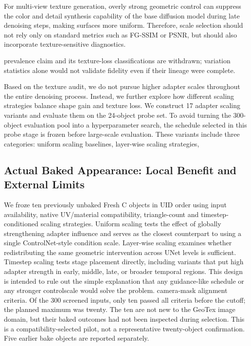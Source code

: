 \documentclass[times,twocolumn,final]{elsarticle}
\providecommand{\DIFadd}[1]{{\protect\color{blue} \sf #1}} %
\providecommand{\DIFdel}[1]{{\protect\color{red} \scriptsize #1}} %
\providecommand{\DIFaddbegin}{} %
\providecommand{\DIFaddend}{} %
\providecommand{\DIFdelbegin}{} %
\providecommand{\DIFdelend}{} %
\begin{document}
\DIFdel{For multi-view texture generation, overly strong geometric control can suppress the color and detail synthesis capability of the base diffusion model during late denoising steps, making surfaces more uniform. Therefore, scale selection should not rely only on standard metrics such as FG-SSIM or PSNR, but should also incorporate texture-sensitive diagnostics. }%

\DIFdelend \DIFaddbegin \DIFadd{prevalence claim and its texture-loss classifications are withdrawn; variation statistics alone would not validate fidelity even if their lineage were complete.
}\DIFaddend 


\DIFdelbegin \DIFdel{Based on the texture audit, we do not pursue higher adapter scales throughout the entire denoising process. Instead, we further explore how different scaling strategies balance shape gain and texture loss. We construct 17 adapter scaling variants and evaluate them on the 24-object probe set. To avoid turning the 300-object evaluation pool into a hyperparameter search, the schedule selected in this probe stage is frozen before large-scale evaluation. These variants include three categories: uniform scaling baselines, layer-wise scaling strategies, }\DIFdelend \DIFaddbegin \subsection{Actual Baked Appearance: Local Benefit and External Limits}
\label{subsec:new-bake}
\DIFadd{We froze ten previously unbaked Fresh C objects in UID order using input availability, native UV/material compatibility, triangle-count }\DIFaddend and \DIFdelbegin \DIFdel{timestep-conditioned scaling strategies.
Uniform scaling tests the effect of globally strengthening adapter influence and serves as the closest counterpart to using a single ControlNet-style condition scale. Layer-wise scaling examines whether redistributing the same geometric intervention across UNet levels is sufficient. Timestep scaling tests stage placement directly, including variants that put high adapter strength in early, middle, late, or broader temporal regions. This design is intended to rule out the simple explanation that any guidance-like schedule or any stronger controlscale would solve the problem. }\DIFdelend \DIFaddbegin \DIFadd{camera-mask alignment criteria. Of the 300 screened inputs, only ten passed all criteria before the cutoff; the planned maximum was twenty. The ten are not new to the GeoTex image domain, but their baked outcomes had not been inspected during selection. This is a compatibility-selected pilot, not a representative twenty-object confirmation. Five earlier bake objects are reported separately.
}\DIFaddend 
\end{document}
